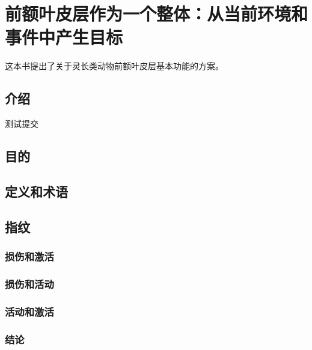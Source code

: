 \chapter{前额叶皮层作为一个整体：从当前环境和事件中产生目标}
这本书提出了关于灵长类动物前额叶皮层基本功能的方案。

\section{介绍}
测试提交
\section{目的}

\section{定义和术语}


\section{指纹}

\subsection{损伤和激活}

\subsection{损伤和活动}

\subsection{活动和激活}




\subsection{结论}


